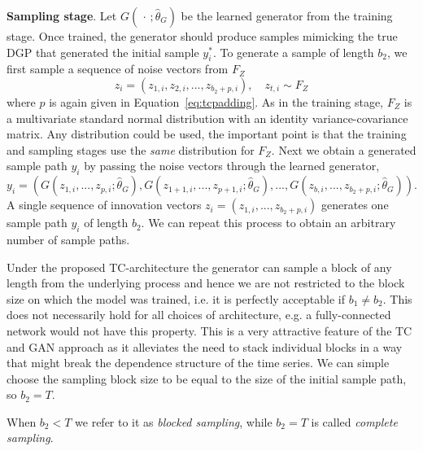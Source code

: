 \documentclass[12pt]{article}
\begin{document}
\textbf{Sampling stage}. Let $G(\, \cdot \,; \hat\theta_G)$ be the learned generator from the training stage. Once trained, the generator should produce samples mimicking the true DGP that generated the initial sample $y_i^*$. To generate a sample of length $b_2$, we first sample a sequence of noise vectors from $F_Z$
$$z_i = (z_{1,i}, z_{2,i}, ..., z_{b_2 + p,i}), \quad z_{t,i} \sim F_Z$$
where $p$ is again given in Equation~\ref{eq:tcpadding}. As in the training stage, $F_Z$ is a multivariate standard normal distribution with an identity variance-covariance matrix. Any distribution could be used, the important point is that the training and sampling stages use the \emph{same} distribution for $F_Z$. %
Next we obtain a generated sample path $y_i$ by passing the noise vectors through the learned generator,
$$y_i = (G(z_{1,i}, ..., z_{p,i}; \hat\theta_G), G(z_{1+1,i}, ..., z_{p+1,i}; \hat\theta_G), ..., \allowbreak G(z_{b,i}, ..., z_{b_2+p,i}; \hat\theta_G)).$$
A single sequence of innovation vectors $z_i = (z_{1,i}, ..., z_{b_2 +p,i})$ generates one sample path $y_i$ of length $b_2$. We can repeat this process to obtain an arbitrary number of sample paths. 

Under the proposed TC-architecture the generator can sample a block of any length from the underlying process and hence we are not restricted to the block size on which the model was trained, i.e. it is perfectly acceptable if $b_1 \not= b_2$. This does not necessarily hold for all choices of architecture, e.g. a fully-connected network would not have this property. This is a very attractive feature of the TC and GAN approach as it alleviates the need to stack individual blocks in a way that might break the dependence structure of the time series. We can simple choose the sampling block size to be equal to the size of the initial sample path, so $b_2 = T$. 

When $b_2 < T$ we refer to it as \emph{blocked sampling}, while $b_2 = T$ is called \emph{complete sampling}.
\end{document}
